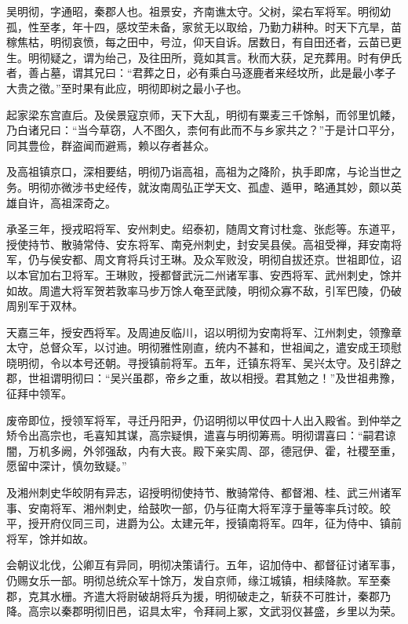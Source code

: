 \documentclass[]{article}
\begin{document}
吴明彻，字通昭，秦郡人也。祖景安，齐南谯太守。父树，梁右军将军。明彻幼孤，性至孝，年十四，感坟茔未备，家贫无以取给，乃勤力耕种。时天下亢旱，苗稼焦枯，明彻哀愤，每之田中，号泣，仰天自诉。居数日，有自田还者，云苗已更生。明彻疑之，谓为绐己，及往田所，竟如其言。秋而大获，足充葬用。时有伊氏者，善占墓，谓其兄曰：``君葬之日，必有乘白马逐鹿者来经坟所，此是最小孝子大贵之徵。''至时果有此应，明彻即树之最小子也。

起家梁东宫直后。及侯景寇京师，天下大乱，明彻有粟麦三千馀斛，而邻里饥餧，乃白诸兄曰：``当今草窃，人不图久，柰何有此而不与乡家共之？''于是计口平分，同其豊俭，群盗闻而避焉，赖以存者甚众。

及高祖镇京口，深相要结，明彻乃诣高祖，高祖为之降阶，执手即席，与论当世之务。明彻亦微涉书史经传，就汝南周弘正学天文、孤虚、遁甲，略通其妙，颇以英雄自许，高祖深奇之。

承圣三年，授戎昭将军、安州刺史。绍泰初，随周文育讨杜龛、张彪等。东道平，授使持节、散骑常侍、安东将军、南兗州刺史，封安吴县侯。高祖受禅，拜安南将军，仍与侯安都、周文育将兵讨王琳。及众军败没，明彻自拔还京。世祖即位，诏以本官加右卫将军。王琳败，授都督武沅二州诸军事、安西将军、武州刺史，馀并如故。周遣大将军贺若敦率马步万馀人奄至武陵，明彻众寡不敌，引军巴陵，仍破周别军于双林。

天嘉三年，授安西将军。及周迪反临川，诏以明彻为安南将军、江州刺史，领豫章太守，总督众军，以讨迪。明彻雅性刚直，统内不甚和，世祖闻之，遣安成王顼慰晓明彻，令以本号还朝。寻授镇前将军。五年，迁镇东将军、吴兴太守。及引辞之郡，世祖谓明彻曰：``吴兴虽郡，帝乡之重，故以相授。君其勉之！''及世祖弗豫，征拜中领军。

废帝即位，授领军将军，寻迁丹阳尹，仍诏明彻以甲仗四十人出入殿省。到仲举之矫令出高宗也，毛喜知其谋，高宗疑惧，遣喜与明彻筹焉。明彻谓喜曰：``嗣君谅闇，万机多阙，外邻强敌，内有大丧。殿下亲实周、邵，德冠伊、霍，社稷至重，愿留中深计，慎勿致疑。''

及湘州刺史华皎阴有异志，诏授明彻使持节、散骑常侍、都督湘、桂、武三州诸军事、安南将军、湘州刺史，给鼓吹一部，仍与征南大将军淳于量等率兵讨皎。皎平，授开府仪同三司，进爵为公。太建元年，授镇南将军。四年，征为侍中、镇前将军，馀并如故。

会朝议北伐，公卿互有异同，明彻决策请行。五年，诏加侍中、都督征讨诸军事，仍赐女乐一部。明彻总统众军十馀万，发自京师，缘江城镇，相续降款。军至秦郡，克其水栅。齐遣大将尉破胡将兵为援，明彻破走之，斩获不可胜计，秦郡乃降。高宗以秦郡明彻旧邑，诏具太牢，令拜祠上冢，文武羽仪甚盛，乡里以为荣。
\end{document}

